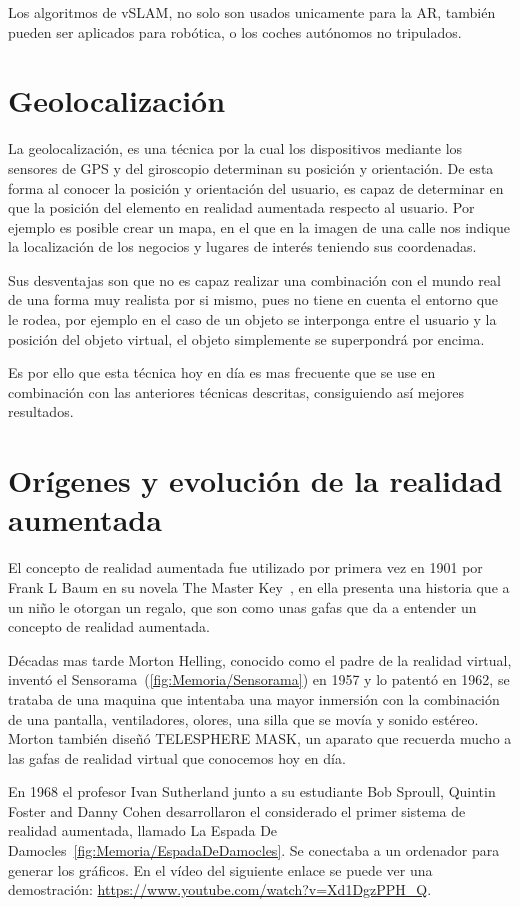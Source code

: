 Los algoritmos de vSLAM, no solo son usados unicamente para la AR, también pueden ser aplicados para robótica, o los coches autónomos no tripulados.

\section{Geolocalización}
La geolocalización, es una técnica por la cual los dispositivos mediante los sensores de GPS y del giroscopio determinan su posición y orientación. De esta forma al conocer la posición y orientación del usuario, es capaz de determinar en que la posición del elemento en realidad aumentada respecto al usuario.
Por ejemplo es posible crear un mapa, en el que en la imagen de una calle nos indique la localización de los negocios y lugares de interés teniendo sus coordenadas.

Sus desventajas son que no es capaz realizar una combinación con el mundo real de una forma muy realista por si mismo, pues no tiene en cuenta el entorno que le rodea, por ejemplo en el caso de un objeto se interponga entre el usuario y la posición del objeto virtual, el objeto simplemente se superpondrá por encima.

Es por ello que esta técnica hoy en día es mas frecuente que se use en combinación con las anteriores técnicas descritas, consiguiendo así mejores resultados.

\section{Orígenes y evolución de la realidad aumentada}
El concepto de realidad aumentada fue utilizado por primera vez en 1901 por Frank L Baum en su novela The Master Key~\cite{theMasterKey}, en ella presenta una historia que a un niño le otorgan un regalo, que son como unas gafas que da a entender un concepto de realidad aumentada.

Décadas mas tarde Morton Helling, conocido como el padre de la realidad virtual, inventó el Sensorama~(\ref{fig:Memoria/Sensorama}) en 1957 y lo patentó en 1962, se trataba de una maquina que intentaba una mayor inmersión con la combinación de una pantalla, ventiladores, olores, una silla que se movía y sonido estéreo. Morton también diseñó TELESPHERE MASK, un aparato que recuerda mucho a las gafas de realidad virtual que conocemos hoy en día.


En 1968 el profesor Ivan Sutherland junto a su estudiante Bob Sproull, Quintin Foster and Danny Cohen desarrollaron el considerado el primer sistema de realidad aumentada, llamado La Espada De Damocles~\ref{fig:Memoria/EspadaDeDamocles}. Se conectaba a un ordenador para generar los gráficos. En el vídeo del siguiente enlace se puede ver una demostración: \url{https://www.youtube.com/watch?v=Xd1DgzPPH_Q}.

